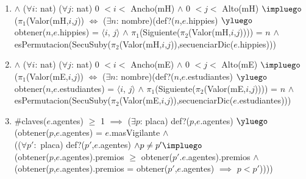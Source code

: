 \begin{Representacion}
{\begin{enumerate}
		($pi_1$(Valor(mAg,$i$,$j$)) $\iff$ \\
		($\exists n$: nombre)(def?($p$,$e$.placasPos) $\land$ def?($p$,$e$.agentes)) $\yluego$\\
		(obtener($p$,$e$.placasPos) = $\langle i$, $j \rangle$ $\land$ $\pi_2$(Valor(mAg,$i$,$j$)) = obtener($p$,$e$.agentes)))
		\item $\land$ ($\forall i$: nat) ($\forall j$: nat) 0 $< i <$ Ancho(mH) $\land$ 0 $< j <$ Alto(mH) $\impluego$ \\
		($\pi_1$(Valor(mH,$i$,$j$)) $\iff$ ($\exists n$: nombre)(def?($n$,$e$.hippies) $\yluego$ \\
		obtener($n$,$e$.hippies) = $\langle i$, $j \rangle$ $\land$ $\pi_1$(Siguiente($\pi_2$(Valor(mH,$i$,$j$)))) = $n$ $\land$ \\
		esPermutacion(SecuSuby($\pi_2$(Valor(mH,$i$,$j$)),secuenciarDic($e$.hippies)))
		\item $\land$ ($\forall i$: nat) ($\forall j$: nat) 0 $< i <$ Ancho(mE) $\land$ 0 $< j <$ Alto(mE) $\impluego$ \\
		($\pi_1$(Valor(mE,$i$,$j$)) $\iff$ ($\exists n$: nombre)(def?($n$,$e$.estudiantes) $\yluego$ \\
		obtener($n$,$e$.estudiantes) = $\langle i$, $j \rangle$ $\land$ $\pi_1$(Siguiente($\pi_2$(Valor(mE,$i$,$j$)))) = $n$ $\land$ \\
		esPermutacion(SecuSuby($\pi_2$(Valor(mE,$i$,$j$)),secuenciarDic($e$.estudiantes)))
		\item $\#$claves($e$.agentes) $\geq$ 1 $\implies$ ($\exists p$: placa) def?($p$,$e$.agentes) $\yluego$ \\
		(obtener($p$,$e$.agentes) = $e$.masVigilante $\land$ \\
		(($\forall p':$ placa) def?($p'$,$e$.agentes) $\land p \neq p' \impluego$\\
		(obtener($p$,$e$.agentes).premios $\geq$ obtener($p'$.$e$.agentes).premios $\land$ \\
		(obtener($p$,$e$.agentes).premios = obtener($p'$,$e$.agentes) $\implies$ $p < p'$))))

	\end{enumerate}
  }\mbox{}
	
	\clearpage



\end{Representacion}
